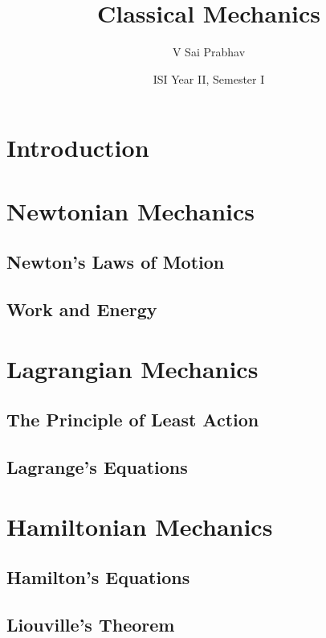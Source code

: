 \documentclass{book}
\title{Classical Mechanics}
\author{V Sai Prabhav}
\date{ISI Year II, Semester I}
\begin{document}
\maketitle

\chapter{Introduction}

\chapter{Newtonian Mechanics}
\section{Newton's Laws of Motion}
\section{Work and Energy}

\chapter{Lagrangian Mechanics}
\section{The Principle of Least Action}
\section{Lagrange's Equations}

\chapter{Hamiltonian Mechanics}
\section{Hamilton's Equations}
\section{Liouville's Theorem}


\printindex
\end{document}
